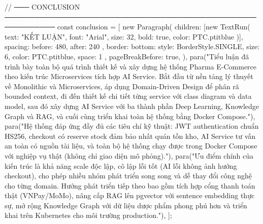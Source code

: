 {{{// ─── CONCLUSION ────────────────────────────────────────────────────────────
const conclusion = [
  new Paragraph({
    children: [new TextRun({ text: "KẾT LUẬN", font: "Arial", size: 32, bold: true, color: PTC.ptitblue })],
    spacing: { before: 480, after: 240 },
    border: { bottom: { style: BorderStyle.SINGLE, size: 6, color: PTC.ptitblue, space: 1 } },
    pageBreakBefore: true,
  }),
  para("Tiểu luận đã trình bày toàn bộ quá trình thiết kế và xây dựng hệ thống Pharma E-Commerce theo kiến trúc Microservices tích hợp AI Service. Bắt đầu từ nền tảng lý thuyết về Monolithic và Microservices, áp dụng Domain-Driven Design để phân rã bounded context, đi đến thiết kế chi tiết từng service với class diagram và data model, sau đó xây dựng AI Service với ba thành phần Deep Learning, Knowledge Graph và RAG, và cuối cùng triển khai toàn hệ thống bằng Docker Compose."),
  para("Hệ thống đáp ứng đầy đủ các tiêu chí kỹ thuật: JWT authentication chuẩn HS256, checkout có reserve stock đảm bảo nhất quán tồn kho, AI Service tư vấn an toàn có nguồn tài liệu, và toàn bộ hệ thống chạy được trong Docker Compose với nghiệp vụ thật (không chỉ giao diện mô phỏng)."),
  para("Ưu điểm chính của kiến trúc là khả năng scale độc lập, cô lập lỗi tốt (AI lỗi không ảnh hưởng checkout), cho phép nhiều nhóm phát triển song song và dễ thay đổi công nghệ cho từng domain. Hướng phát triển tiếp theo bao gồm tích hợp cổng thanh toán thật (VNPay/MoMo), nâng cấp RAG lên pgvector với sentence embedding thực sự, mở rộng Knowledge Graph với dữ liệu dược phẩm phong phú hơn và triển khai trên Kubernetes cho môi trường production."),
];

}}}
